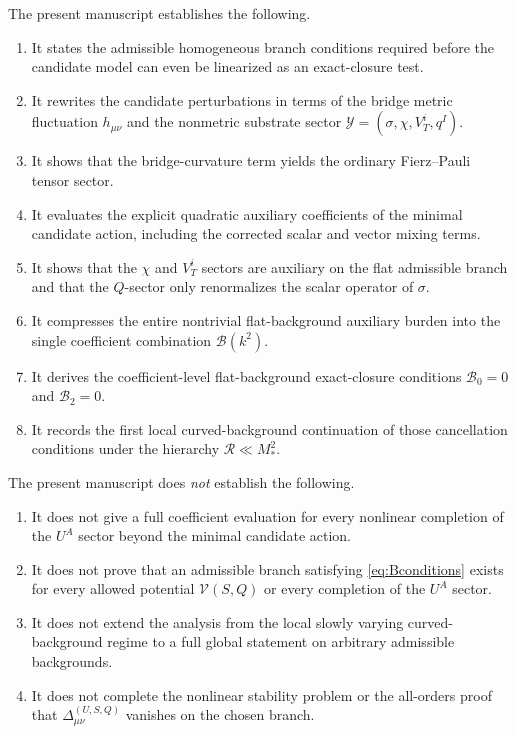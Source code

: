 \documentclass[11pt]{article}
\newcommand{\Extra}{\mathcal{Y}}
\begin{document}
The present manuscript establishes the following.
\begin{enumerate}
    \item It states the admissible homogeneous branch conditions required before the candidate model can even be linearized as an exact-closure test.
    \item It rewrites the candidate perturbations in terms of the bridge metric fluctuation \(h_{\mu\nu}\) and the nonmetric substrate sector \(\Extra=(\sigma,\chi,V_T^i,q^I)\).
    \item It shows that the bridge-curvature term yields the ordinary Fierz--Pauli tensor sector.
    \item It evaluates the explicit quadratic auxiliary coefficients of the minimal candidate action, including the corrected scalar and vector mixing terms.
    \item It shows that the \(\chi\) and \(V_T^i\) sectors are auxiliary on the flat admissible branch and that the \(Q\)-sector only renormalizes the scalar operator of \(\sigma\).
    \item It compresses the entire nontrivial flat-background auxiliary burden into the single coefficient combination \(\mathcal B(k^2)\).
    \item It derives the coefficient-level flat-background exact-closure conditions \(\mathcal B_0=0\) and \(\mathcal B_2=0\).
    \item It records the first local curved-background continuation of those cancellation conditions under the hierarchy \(\mathcal R\ll M_*^2\).
\end{enumerate}

The present manuscript does \emph{not} establish the following.
\begin{enumerate}
    \item It does not give a full coefficient evaluation for every nonlinear completion of the \(U^A\) sector beyond the minimal candidate action.
    \item It does not prove that an admissible branch satisfying \eqref{eq:Bconditions} exists for every allowed potential \(\mathcal V(S,Q)\) or every completion of the \(U^A\) sector.
    \item It does not extend the analysis from the local slowly varying curved-background regime to a full global statement on arbitrary admissible backgrounds.
    \item It does not complete the nonlinear stability problem or the all-orders proof that \(\Delta_{\mu\nu}^{(U,S,Q)}\) vanishes on the chosen branch.
\end{enumerate}
\end{document}
